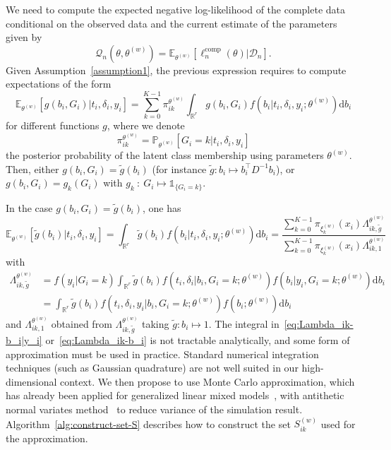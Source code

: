 \documentclass[11pt]{article}
\newcommand{\dd}{\mathrm{d}}
\newcommand{\ind}[1]{\mathds{1}_{#1}}
\newcommand{\cD}{\mathcal D}
\newcommand{\cQ}{\mathcal Q}
\newcommand{\R}{\mathds R}
\newcommand{\E}{\mathds E}
\renewcommand{\P}{\mathds P}
\begin{document}
We need to compute the expected negative log-likelihood of the complete data conditional on the observed data and the current estimate of the parameters given by 
\begin{equation*}
  \cQ_n(\theta, \theta^{(w)}) = \E_{\theta^{(w)}}[\ell_n^\text{comp}(\theta) | \cD_n].
\end{equation*}
Given Assumption~\ref{assumption1}, the previous expression requires to compute expectations of the form
\[ \E_{\theta^{(w)}}[ g(b_i, G_i) | t_i, \delta_i, y_i] = \sum_{k=0}^{K-1} \pi_{ik}^{\theta^{(w)}} \int_{\R^r} g(b_i, G_i) f(b_i | t_i, \delta_i, y_i ; \theta^{(w)}) \dd b_i \]
for different functions $g$, where we denote 
\begin{equation}
  \label{eq:pi_ik-def}
  \pi_{ik}^{\theta^{(w)}} = \P_{\theta^{(w)}}[G_i = k | t_i, \delta_i, y_i] 
\end{equation}
the posterior probability of the latent class membership using parameters $\theta^{(w)}$. 
Then, either $g(b_i, G_i) = \tilde g(b_i)$ (for instance $\tilde g: b_i \mapsto b_i^\top D^{-1}b_i$), or $g(b_i, G_i) = g_k(G_i)$ with $g_k~:~G_i \mapsto \ind{\{G_i=k\}}$.

In the case $g(b_i, G_i) = \tilde g(b_i)$, one has
\begin{equation}
  \label{eq:def-E-g-tilde}
  \E_{\theta^{(w)}}[ \tilde g(b_i) | t_i, \delta_i, y_i] = \int_{\R^r} \tilde g(b_i) f(b_i | t_i, \delta_i, y_i ; \theta^{(w)}) \dd b_i = \dfrac{ \sum_{k=0}^{K-1} \pi_{\xi_k^{(w)}}(x_i) \Lambda_{ik,\tilde g}^{\theta^{(w)}}}{\sum_{k=0}^{K-1} \pi_{\xi_k^{(w)}}(x_i) \Lambda_{ik,1}^{\theta^{(w)}}}
\end{equation}
with
\begin{align}
  \label{eq:Lambda_ik-b_i|y_i}
  \Lambda_{ik,\tilde g}^{\theta^{(w)}} &= f(y_i | G_i = k) \int_{\R^r} \tilde g(b_i) f(t_i, \delta_i | b_i, G_i = k ; \theta^{(w)}) f(b_i | y_i, G_i = k; \theta^{(w)}) \dd b_i \\
  \label{eq:Lambda_ik-b_i}
  &= \int_{\R^r} \tilde g(b_i) f(t_i, \delta_i, y_i | b_i, G_i = k ; \theta^{(w)}) f(b_i ; \theta^{(w)}) \dd b_i
\end{align}
and $\Lambda_{ik,1}^{\theta^{(w)}}$ obtained from $\Lambda_{ik,\tilde g}^{\theta^{(w)}}$ taking $\tilde g: b_i \mapsto 1$.
The integral in~\eqref{eq:Lambda_ik-b_i|y_i} or~\eqref{eq:Lambda_ik-b_i} is not tractable analytically, and some form of approximation must be used in practice. Standard numerical integration techniques (such as Gaussian quadrature) are not well suited in our high-dimensional context. We then propose to use Monte Carlo approximation, which has already been applied for generalized linear mixed models~\citep{booth1999maximizing}, with antithetic normal variates method~\citep{hammersley1956new} to reduce variance of the simulation result. Algorithm~\ref{alg:construct-set-S} describes how to construct the set $S_{ik}^{(w)}$ used for the approximation.
\end{document}
